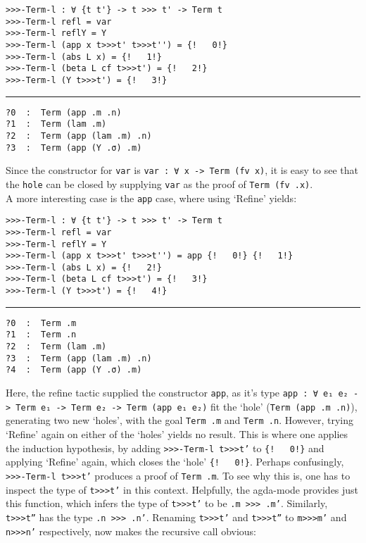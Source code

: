 \documentclass[a4paper, 12pt, twoside]{style/ociamthesis}
\theoremstyle{plain}
\theoremstyle{definition}
\theoremstyle{remark}
\begin{document}
\begin{verbatim}
>>>-Term-l : ∀ {t t'} -> t >>> t' -> Term t
>>>-Term-l refl = var
>>>-Term-l reflY = Y
>>>-Term-l (app x t>>>t' t>>>t'') = {!   0!}
>>>-Term-l (abs L x) = {!   1!}
>>>-Term-l (beta L cf t>>>t') = {!   2!}
>>>-Term-l (Y t>>>t') = {!   3!}
\end{verbatim}

\noindent\rule{8cm}{0.4pt}

\begin{verbatim}
?0  :  Term (app .m .n)
?1  :  Term (lam .m)
?2  :  Term (app (lam .m) .n)
?3  :  Term (app (Y .σ) .m)
\end{verbatim}

Since the constructor for \texttt{var} is
\texttt{var : ∀ {x} -> Term (fv x)}, it is easy to see that the
\texttt{hole} can be closed by supplying \texttt{var} as the proof of
\texttt{Term (fv .x)}.\\
A more interesting case is the \texttt{app} case, where using `Refine'
yields:

\begin{verbatim}
>>>-Term-l : ∀ {t t'} -> t >>> t' -> Term t
>>>-Term-l refl = var
>>>-Term-l reflY = Y
>>>-Term-l (app x t>>>t' t>>>t'') = app {!   0!} {!   1!}
>>>-Term-l (abs L x) = {!   2!}
>>>-Term-l (beta L cf t>>>t') = {!   3!}
>>>-Term-l (Y t>>>t') = {!   4!}
\end{verbatim}

\noindent\rule{8cm}{0.4pt}

\begin{verbatim}
?0  :  Term .m
?1  :  Term .n
?2  :  Term (lam .m)
?3  :  Term (app (lam .m) .n)
?4  :  Term (app (Y .σ) .m)
\end{verbatim}

Here, the refine tactic supplied the constructor \texttt{app}, as it's
type \texttt{app : ∀ {e₁ e₂} -> Term e₁ -> Term e₂ -> Term (app e₁ e₂)}
fit the `hole' (\texttt{Term (app .m .n)}), generating two new `holes',
with the goal \texttt{Term .m} and \texttt{Term .n}. However, trying
`Refine' again on either of the `holes' yields no result. This is where
one applies the induction hypothesis, by adding
\texttt{>>>-Term-l t>>>t'} to \texttt{\{!\ \ \ 0!\}} and applying
`Refine' again, which closes the `hole' \texttt{\{!\ \ \ 0!\}}. Perhaps
confusingly, \texttt{>>>-Term-l t>>>t'} produces a proof of
\texttt{Term .m}. To see why this is, one has to inspect the type of
\texttt{t>>>t'} in this context. Helpfully, the agda-mode provides just
this function, which infers the type of \texttt{t>>>t'} to be
\texttt{.m >>> .m'}. Similarly, \texttt{t>>>t''} has the type
\texttt{.n >>> .n'}. Renaming \texttt{t>>>t'} and \texttt{t>>>t''} to
\texttt{m>>>m'} and \texttt{n>>>n'} respectively, now makes the
recursive call obvious:
\end{document}

